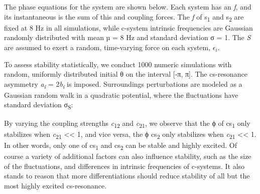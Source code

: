 

  The phase equations for the system are shown below. Each system has an  \textit{f}, and its instantaneous  is the sum of this  and coupling forces. The \textit{f} of s\textsubscript{1} and s\textsubscript{2} are fixed at 8 Hz in all simulations, while c-system intrinsic frequencies are Gaussian randomly distributed with mean µ = 8 Hz and standard deviation σ = 1. The  \textit{S} are assumed to exert a random, time-varying force on each system,  ${\epsilon} _{i}$. 


  To assess stability statistically, we conduct 1000 numeric simulations with random, uniformly distributed initial θ on the interval [-π, π]. The cs-resonance asymmetry \textit{a\textsubscript{i}} = 2\textit{b\textsubscript{i}} is imposed. Surroundings perturbations are modeled as a Gaussian random walk in a quadratic potential, where the fluctuations have standard deviation σ\textsubscript{S}:

 

  By varying the coupling strengths \textit{c}\textsubscript{12} and \textit{c}\textsubscript{21},  we observe that the ϕ of cs\textsubscript{1} only stabilizes when \textit{c}\textsubscript{21} << 1, and vice versa, the ϕ  cs\textsubscript{2} only stabilizes when \textit{c}\textsubscript{21} << 1. In other words, only one of cs\textsubscript{1} and cs\textsubscript{2} can be stable and highly excited. Of course a variety of additional factors can also influence stability, such as the size of the  fluctuations, and differences in intrinsic frequencies of c-systems. It also stands to reason that more differentiations should reduce stability of all but the most highly excited cs-resonance.

